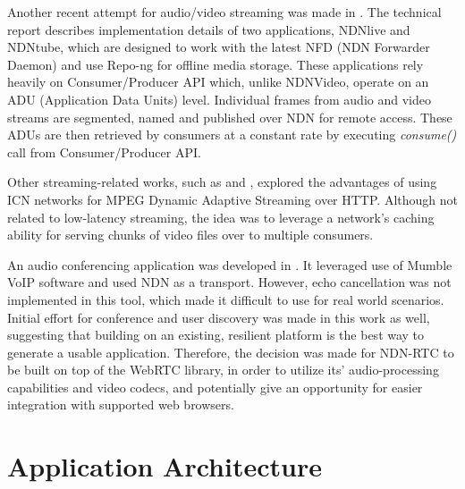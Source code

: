 \documentclass{icn/sig-alternate-2012} %
\newcommand{\ndnrtcName}{NDN-RTC} %
\begin{document}
Another recent attempt for audio/video streaming was made in \cite{ndnlive-tube}. The technical report describes implementation details of two applications, NDNlive and NDNtube, which are designed to work with the latest NFD (NDN Forwarder Daemon) and use Repo-ng \cite{repo-ng} for offline media storage. These applications rely heavily on Consumer/Producer API \cite{cons-prod-api} which, unlike NDNVideo, operate on an ADU (Application Data Units) level. Individual frames from audio and video streams are segmented, named and published over NDN for remote access. These ADUs are then retrieved by consumers at a constant rate by executing \textit{consume()} call from Consumer/Producer API. %

Other streaming-related works, such as \cite{ccn-dash} and \cite{ndn-dash}, explored the advantages of using ICN networks for MPEG Dynamic Adaptive Streaming over HTTP. Although not related to low-latency streaming, the idea was to leverage a network's caching ability for serving chunks of video files over to multiple consumers.

An audio conferencing application was developed in \cite{act-tool}. It leveraged use of Mumble VoIP software and used NDN as a transport. However, echo cancellation was not implemented in this tool, which made it difficult to use for real world scenarios. Initial effort for conference and user discovery was made in this work as well, suggesting that building on an existing, resilient platform is the best way to generate a usable application. Therefore, the decision was made for \ndnrtcName{} to be built on top of the WebRTC library, in order to utilize its' audio-processing capabilities and video codecs, and potentially give an opportunity for easier integration with supported web browsers.


\section{Application Architecture}
\label{sec:arch}
\end{document}
